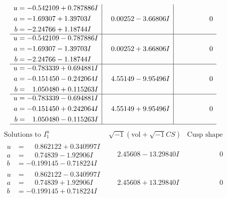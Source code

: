 \documentclass[1p]{elsarticle_modified}
\theoremstyle{definition}
\newcommand{\I}{\sqrt{-1}}
\begin{document}
$$\begin{array}{c|c|c}
\begin{aligned}
u &= -0.542109 + 0.787886 I \\
a &= -1.69307 + 1.39703 I \\
b &= -2.24766 + 1.18744 I\end{aligned}
 & \phantom{-}0.00252 - 3.66806 I & \phantom{-0.000000 } 0 \\ \hline\begin{aligned}
u &= -0.542109 - 0.787886 I \\
a &= -1.69307 - 1.39703 I \\
b &= -2.24766 - 1.18744 I\end{aligned}
 & \phantom{-}0.00252 + 3.66806 I & \phantom{-0.000000 } 0 \\ \hline\begin{aligned}
u &= -0.783339 + 0.694881 I \\
a &= -0.151450 - 0.242064 I \\
b &= \phantom{-}1.050480 + 0.115263 I\end{aligned}
 & \phantom{-}4.55149 - 9.95496 I & \phantom{-0.000000 } 0 \\ \hline\begin{aligned}
u &= -0.783339 - 0.694881 I \\
a &= -0.151450 + 0.242064 I \\
b &= \phantom{-}1.050480 - 0.115263 I\end{aligned}
 & \phantom{-}4.55149 + 9.95496 I & \phantom{-0.000000 } 0\\
 \hline 
 \end{array}$$\newpage$$\begin{array}{c|c|c}  
\text{Solutions to }I^u_{1}& \I (\text{vol} + \sqrt{-1}CS) & \text{Cusp shape}\\
 \hline 
\begin{aligned}
u &= \phantom{-}0.862122 + 0.340997 I \\
a &= \phantom{-}0.74839 - 1.92906 I \\
b &= -0.199145 - 0.718224 I\end{aligned}
 & \phantom{-}2.45608 - 13.29840 I & \phantom{-0.000000 } 0 \\ \hline\begin{aligned}
u &= \phantom{-}0.862122 - 0.340997 I \\
a &= \phantom{-}0.74839 + 1.92906 I \\
b &= -0.199145 + 0.718224 I\end{aligned}
 & \phantom{-}2.45608 + 13.29840 I & \phantom{-0.000000 } 0 \\ \hline\begin{aligned}

\end{aligned}
\end{array}$$
\end{document}
